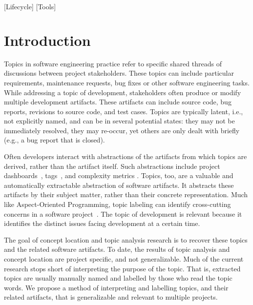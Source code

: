 \documentclass[]{sig-alternate}
\begin{document}
[Lifecycle]
[Tools]



\newcommand{\shrink}{}

\section{Introduction}


Topics in software engineering practice refer to specific shared threads of discussions between project stakeholders. These topics can include particular requirements, maintenance requests, bug fixes or other software engineering tasks. %
While addressing a topic of development, stakeholders often produce or modify multiple development artifacts.
%
These artifacts can include source code, bug reports, revisions to source code, and test cases. 
%
Topics are typically latent, i.e., not explicitly named, and can be in several potential states: they may not be immediately resolved, they may re-occur, yet others are only dealt with briefly  (e.g., a bug report that is closed).

Often developers interact with abstractions of the artifacts from which topics are derived, rather than the artifact itself. 
Such abstractions include project dashboards~\cite{kersten2005mylar}, tags~\cite{treude2010}, and complexity metrics \cite{mccabe1976complexity}. 
Topics, too, are a valuable and automatically extractable abstraction of software artifacts.
It abstracts these artifacts by their subject matter, rather than their concrete representation. 
Much like Aspect-Oriented Programming, topic labeling can identify cross-cutting concerns in a software project~\cite{Baldi2008}.
The topic of development is relevant because it identifies the distinct issues facing development at a certain time.

The goal of concept location and topic analysis research is to recover these topics and the related software artifacts.
To date, the results of topic analysis and concept location are project specific, and not generalizable.
Much of the current research stops short of interpreting the purpose of the topic. 
That is, extracted topics are usually manually named and labelled by those who read the topic words.
We propose a method of interpreting and labelling topics, and their related artifacts, that is generalizable and relevant to multiple projects.
\end{document}
